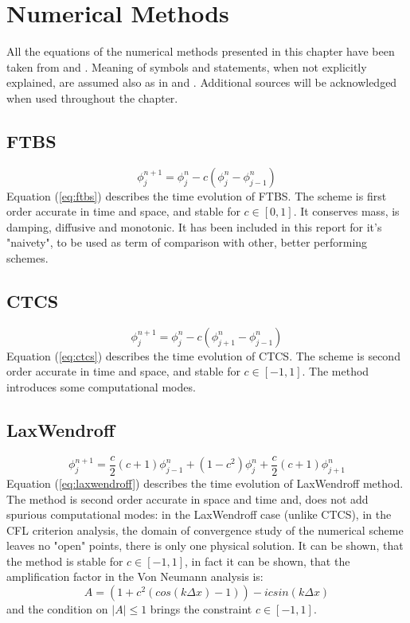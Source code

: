 
\section{Numerical Methods}
All the equations of the numerical methods presented in this chapter have been taken from \cite{mpebook} and \cite{nmnotes}. Meaning of symbols and statements, when not explicitly explained, are assumed also as in \cite{mpebook} and \cite{nmnotes}. Additional sources will be acknowledged when used throughout the chapter.

\subsection{FTBS}

\begin{equation}
\phi_j^{n+1}=\phi_j^{n}-c(\phi_j^{n}-\phi_{j-1}^{n})
\label{eq:ftbs}
\end{equation}
Equation (\ref{eq:ftbs}) describes the time evolution of FTBS. The scheme is first order accurate in time and space, and stable for $c\in[0,1]$. It conserves mass, is damping, diffusive and monotonic. It has been included in this report for it's "naivety", to be used as term of comparison with other, better performing schemes.


\subsection{CTCS}
\begin{equation}
\phi_j^{n+1}=\phi_j^{n}-c(\phi_{j+1}^{n}-\phi_{j-1}^{n})
\label{eq:ctcs}
\end{equation}
Equation (\ref{eq:ctcs}) describes the time evolution of CTCS. The scheme is second order accurate in time and space, and stable for $c\in[-1,1]$. The method introduces some computational modes.

\subsection{LaxWendroff}
\begin{equation}
\phi_j^{n+1}=\frac{c}{2}(c+1)\phi_{j-1}^{n}+(1-c^2)\phi_{j}^{n}+\frac{c}{2}(c+1)\phi_{j+1}^{n}
\label{eq:laxwendroff}
\end{equation}
Equation (\ref{eq:laxwendroff}) describes the time evolution of LaxWendroff method. The method is second order accurate in space and time and, does not add spurious computational modes: in the LaxWendroff case (unlike CTCS), in the CFL criterion analysis, the domain of convergence study of the numerical scheme leaves no "open" points, there is only one physical solution. It can be shown, that the method is stable for $c\in[-1,1]$, in fact it can be shown, that the amplification factor in the Von Neumann analysis is:
\begin{equation}
\label{eq:laxwen_vonneumann}
A=(1+c^2(cos(k\Delta x)-1))-icsin(k\Delta x)
\end{equation}
and the condition on $|A|\leq1$ brings the constraint $c\in[-1,1]$.

